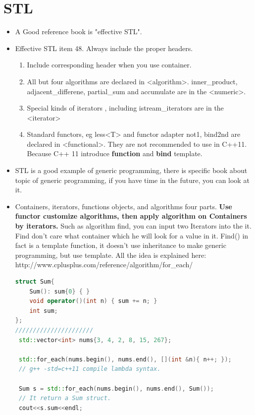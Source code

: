 \documentclass[a4paper,12pt,twoside]{book}
\begin{document}
\chapter{STL}
\begin{itemize}
\item A Good reference book is "effective STL".
\item Effective STL item 48. Always include the proper headers.
\begin{enumerate}
\item Include corresponding header when you use container.
\item All but four algorithms are declared in <algorithm>. inner\_product, adjacent\_differene, partial\_sum and accumulate are in the <numeric>.
\item Special kinds of iterators , including istream\_iterators are in the <iterator>
\item Standard functors, eg less<T> and functor adapter not1, bind2nd are declared in <functional>. They are not recommended to use in C++11. Because C++ 11 introduce \textbf{function} and \textbf{bind} template.
\end{enumerate}

\item STL is a good example  of generic programming,  there is specific book about topic of generic programming, if you have time in the future, you can look at it.
\item Containers, iterators, functions objects, and algorithms four parts. \textbf{Use functor customize algorithms, then apply algorithm on Containers by iterators.} Such as algorithm find, you can input two Iterators into the it.  Find don't care what container which he will look for a value in it.  Find() in fact is a template function, it doesn't use inheritance to make generic programming, but use template.   All the idea is explained here:
http://www.cplusplus.com/reference/algorithm/for\_each/

\begin{lstlisting}[frame=single, language=c++]
struct Sum{
    Sum(): sum{0} { }
    void operator()(int n) { sum += n; }
    int sum;
};
//////////////////////
 std::vector<int> nums{3, 4, 2, 8, 15, 267};

 std::for_each(nums.begin(), nums.end(), [](int &n){ n++; });
 // g++ -std=c++11 compile lambda syntax.

 Sum s = std::for_each(nums.begin(), nums.end(), Sum());
 // It return a Sum struct.
 cout<<s.sum<<endl;
\end{lstlisting}

\end{itemize}
\end{document}
